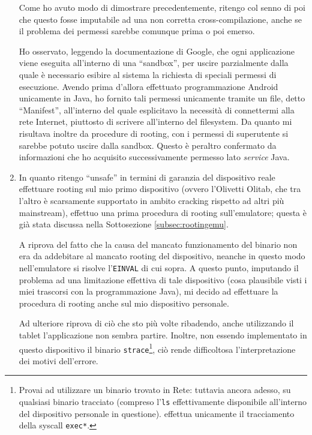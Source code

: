 \begin{enumerate}
       Come ho avuto modo di dimostrare precedentemente, ritengo col senno di
       poi che questo fosse imputabile ad una non corretta
       cross-compilazione, anche se il problema dei permessi sarebbe  
       comunque prima o poi emerso.
       
       Ho osservato, leggendo la documentazione di Google, che 
       ogni applicazione viene eseguita all'interno di una ``sandbox'', per 
       uscire parzialmente dalla quale è necessario esibire al sistema la 
       richiesta di speciali permessi di esecuzione. Avendo prima d'allora
       effettuato programmazione Android unicamente in Java, ho fornito tali
       permessi unicamente tramite un file, detto ``Manifest'', all'interno
       del quale esplicitavo la necessità di connettermi alla rete Internet, piuttosto
       di scrivere all'interno del filesystem. Da quanto mi risultava inoltre da
       procedure di rooting, con i permessi di superutente si sarebbe potuto
       uscire dalla sandbox. Questo è peraltro confermato da informazioni che
       ho acquisito successivamente permesso lato \textit{service} Java.
\item In quanto ritengo ``unsafe'' in termini di garanzia del dispositivo reale
       effettuare rooting sul mio primo dispositivo (ovvero l'Olivetti Olitab, 
       che tra l'altro è scarsamente supportato
       in ambito cracking rispetto ad altri più mainstream), effettuo una prima
       procedura di rooting sull'emulatore; questa è già stata discussa nella
       Sottosezione \vref{subsec:rootingemu}. 
       
       A riprova del fatto che la
       causa del mancato funzionamento del binario non era da addebitare al mancato rooting del dispositivo, 
       neanche in questo modo nell'emulatore
       si risolve l'\texttt{EINVAL} di cui sopra. A questo punto, imputando 
       il problema ad una limitazione effettiva di tale dispositivo (cosa
       plausibile visti i miei trascorsi con la programmazione Java), mi decido
       ad effettuare la procedura di rooting anche sul mio dispositivo personale.
       
       Ad ulteriore riprova di ciò che sto più volte ribadendo,
       anche utilizzando il tablet l'applicazione non sembra partire. Inoltre, non 
       essendo implementato in questo dispositivo il binario \texttt{\small strace}\footnote{
       Provai ad utilizzare un binario trovato in Rete: tuttavia ancora adesso,
       su qualsiasi binario tracciato (compreso l'\texttt{ls} effettivamente 
       disponibile all'interno del dispositivo personale in questione). effettua
       unicamente il tracciamento della syscall \texttt{exec*}.}, ciò rende 
       difficoltosa l'interpretazione dei motivi dell'errore.
       

\end{enumerate}

